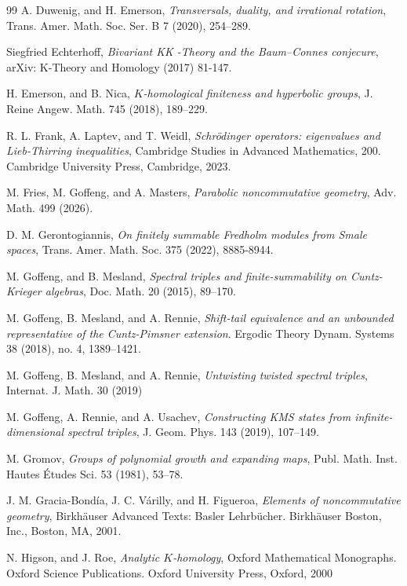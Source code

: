 \documentclass[a4paper,reqno]{amsart}
\numberwithin{equation}{section}
\theoremstyle{definition}
\theoremstyle{remark}
\begin{document}
\begin{thebibliography}{99}
 A. Duwenig, and H. Emerson, \emph{Transversals, duality, and irrational rotation}, Trans. Amer. Math. Soc. Ser. B 7 (2020), 254--289. 

 Siegfried Echterhoff,
  \emph{Bivariant KK -Theory and the Baum–Connes conjecure}, arXiv: K-Theory and Homology (2017) 81-147.
  
 H. Emerson, and B. Nica, \emph{$K$-homological finiteness and hyperbolic groups}, J. Reine Angew. Math. 745 (2018), 189--229. 


 R. L. Frank, A. Laptev, and T. Weidl, \emph{Schrödinger operators: eigenvalues and Lieb-Thirring inequalities}, Cambridge Studies in Advanced Mathematics, 200. Cambridge University Press, Cambridge, 2023.

 M. Fries, M. Goffeng, and A. Masters, \emph{Parabolic noncommutative geometry}, Adv. Math. 499 (2026). 


 D. M. Gerontogiannis, \emph{On finitely summable Fredholm modules from Smale spaces}, Trans. Amer. Math. Soc. 375 (2022), 8885-8944. 


 M. Goffeng, and B. Mesland, \emph{Spectral triples and finite-summability on Cuntz-Krieger algebras}, Doc. Math. 20 (2015), 89--170. 


 M. Goffeng, B. Mesland, and A. Rennie, \emph{Shift-tail equivalence and an unbounded representative of the Cuntz-Pimsner extension}. Ergodic Theory Dynam. Systems 38 (2018), no. 4, 1389--1421.

 M. Goffeng, B. Mesland, and A. Rennie, \emph{Untwisting twisted spectral triples}, Internat. J. Math. 30 (2019)

 M. Goffeng, A. Rennie, and A. Usachev, \emph{Constructing KMS states from infinite-dimensional spectral triples}, J. Geom. Phys. 143 (2019), 107--149. 



 M. Gromov, \emph{Groups of polynomial growth and expanding maps}, Publ. Math. Inst. Hautes Études Sci. 53 (1981), 53--78.


 J. M. Gracia-Bondía, J. C. Várilly, and H. Figueroa, \emph{Elements of noncommutative geometry}, Birkhäuser Advanced Texts: Basler Lehrbücher. Birkhäuser Boston, Inc., Boston, MA, 2001.

 N. Higson, and J. Roe, \emph{Analytic $K$-homology}, Oxford Mathematical Monographs. Oxford Science Publications. Oxford University Press, Oxford, 2000


\end{thebibliography}
\end{document}
